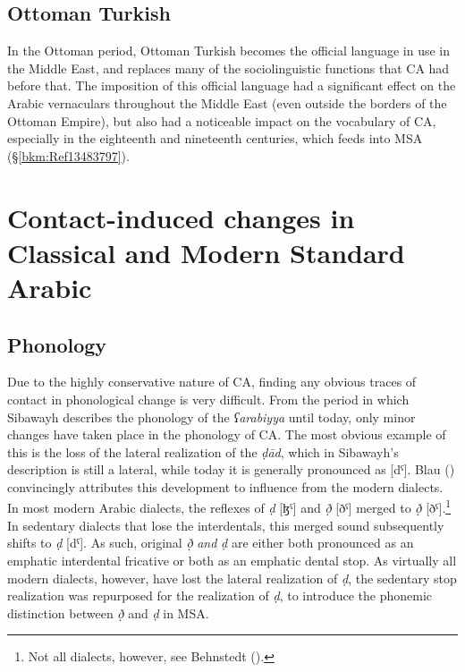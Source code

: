 \documentclass[output=paper]{langsci/langscibook}
\begin{document}
\subsection{Ottoman Turkish}

In the Ottoman period, Ottoman Turkish becomes the official language in use in the Middle East, and replaces many of the sociolinguistic functions that CA had before that. The imposition of this official language had a significant effect on the Arabic vernaculars throughout the Middle East (even outside the borders of the Ottoman Empire), but also had a noticeable impact on the vocabulary of CA, especially in the eighteenth and nineteenth centuries, which feeds into MSA (§\ref{bkm:Ref13483797}).

\section{Contact-induced changes in Classical and Modern Standard Arabic}
\subsection{\label{bkm:Ref12953419}Phonology}

Due to the highly conservative nature of CA, finding any obvious traces of contact in phonological change is very difficult. From the period in which Sibawayh describes the phonology of the \textit{ʕarabiyya} until today, only minor changes have taken place in the phonology of CA. The most obvious example of this is the loss of the lateral realization of the \textit{ḍād}, which in Sibawayh’s description is still a lateral, while today it is generally pronounced as [dˤ]. Blau (\citeyear[162--163]{Blau1969}) convincingly attributes this development to influence from the modern dialects. In most modern Arabic dialects, the reflexes of \textit{ḍ} [ɮˤ] and \textit{ð̣} [ðˤ] merged to \textit{ð̣} [ðˤ].\footnote{Not all dialects, however, see Behnstedt (\citeyear[16ff.]{Behnstedt2016Yemen}).} In sedentary dialects that lose the interdentals, this merged sound subsequently shifts to \textit{ḍ} [dˤ]. As such, original \textit{ð̣} \textit{and} \textit{ḍ} are either both pronounced as an emphatic interdental fricative or both as an emphatic dental stop. As virtually all modern dialects, however, have lost the lateral realization of \textit{ḍ}, the sedentary stop realization was repurposed for the realization of \textit{ḍ}, to introduce the phonemic distinction between \textit{ð̣} and \textit{ḍ} in MSA.
\end{document}
